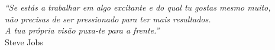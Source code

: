\cleardoublepage
\thispagestyle{plain}

\vspace*{8cm}

\begin{flushright}
   \textsl{``Se estás a trabalhar em algo excitante e do qual tu gostas mesmo muito,\\
	não precisas de ser pressionado para ter mais resultados.\\
	A tua própria visão puxa-te para a frente.''} \\
\vspace*{1.5cm}
           Steve Jobs
\end{flushright}
